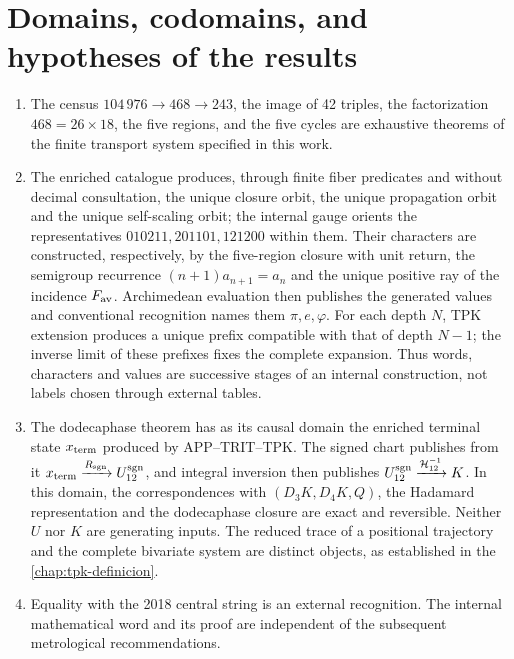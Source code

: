 \chapter{Domains, codomains, and hypotheses of the results}
\label{app:premisas}

\begin{enumerate}
\item The census \(104\,976\to468\to243\), the image of 42 triples, the
factorization \(468=26\times18\), the five regions, and the five cycles are
exhaustive theorems of the finite transport system specified in this work.

\item The enriched catalogue produces, through finite fiber predicates and without
decimal consultation, the unique closure orbit, the unique propagation
orbit and the unique self-scaling orbit; the internal gauge orients
the representatives \(010211,201101,121200\) within them. Their characters are
constructed, respectively, by the five-region closure with unit
return, the semigroup recurrence \((n+1)a_{n+1}=a_n\) and the unique positive ray
of the incidence \(F_{\rm av}\). Archimedean evaluation then publishes
the generated values and conventional recognition names them
\(\pi,e,\varphi\). For each depth \(N\), TPK extension produces
a unique prefix compatible with that of depth \(N-1\); the inverse
limit of these prefixes fixes the complete expansion. Thus words,
characters and values are successive stages of an internal
construction, not labels chosen through external tables.

\item The dodecaphase theorem has as its causal domain the enriched terminal
state \(x_{\rm term}\) produced by APP--TRIT--TPK. The signed chart
publishes from it
\(x_{\rm term}\xrightarrow{R_{\rm sgn}}U_{12}^{\rm sgn}\), and integral
inversion then publishes
\(U_{12}^{\rm sgn}\xrightarrow{\mathcal H_{12}^{-1}}K\). In this domain,
the correspondences with \((D_3K,D_4K,Q)\), the Hadamard representation and
the dodecaphase closure are exact and reversible. Neither \(U\) nor \(K\) are
generating inputs. The reduced trace of a positional trajectory and the
complete bivariate system are distinct objects, as established in the
\cref{chap:tpk-definicion}.

\item Equality with the 2018 central string is an external recognition.
The internal mathematical word and its proof are independent of the
subsequent metrological recommendations.


\end{enumerate}
